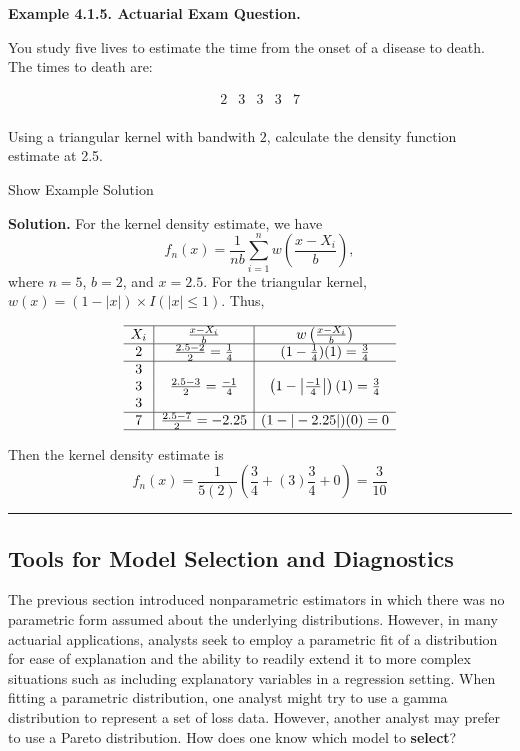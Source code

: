\documentclass[]{book}
\theoremstyle{definition}
\theoremstyle{definition}
\theoremstyle{definition}
\theoremstyle{remark}
\begin{document}
\textbf{Example 4.1.5. Actuarial Exam Question.}

You study five lives to estimate the time from the onset of a disease to
death. The times to death are:

\[
\begin{array}{ccccc}
2 & 3 & 3 & 3 & 7  \\
\end{array}
\]

Using a triangular kernel with bandwith \(2\), calculate the density
function estimate at 2.5.

Show Example Solution

\hypertarget{toggleExampleSelect.1.5}{}
\textbf{Solution.} For the kernel density estimate, we have
\[f_n(x) = \frac{1}{nb} \sum_{i=1}^n w\left(\frac{x-X_i}{b}\right),\]
where \(n=5\), \(b=2\), and \(x=2.5\). For the triangular kernel,
\(w(x) = (1-|x|)\times I(|x| \le 1)\). Thus,

\[
\begin{array}{c|c|c}
\hline
X_i & \frac{x-X_i}{b} & w\left(\frac{x-X_i}{b} \right) \\
\hline
2 & \frac{2.5-2}{2}=\frac{1}{4} &  (1-\frac{1}{4})(1) = \frac{3}{4} \\
\hline
3 & & \\
3 & \frac{2.5-3}{2}=\frac{-1}{4} & \left(1-\left| \frac{-1}{4} \right| \right)(1) = \frac{3}{4} \\
3 & & \\
\hline
7 & \frac{2.5-7}{2}=-2.25 & (1-|-2.25|)(0) = 0\\
\hline
\end{array}
\]

Then the kernel density estimate is
\[f_n(x) = \frac{1}{5(2)}\left( \frac{3}{4} + (3) \frac{3}{4} + 0 \right) = \frac{3}{10}\]

\begin{center}\rule{0.5\linewidth}{\linethickness}\end{center}

\subsection{Tools for Model Selection and
Diagnostics}\label{S:MS:ToolsModelSelection}

The previous section introduced nonparametric estimators in which there
was no parametric form assumed about the underlying distributions.
However, in many actuarial applications, analysts seek to employ a
parametric fit of a distribution for ease of explanation and the ability
to readily extend it to more complex situations such as including
explanatory variables in a regression setting. When fitting a parametric
distribution, one analyst might try to use a gamma distribution to
represent a set of loss data. However, another analyst may prefer to use
a Pareto distribution. How does one know which model to \textbf{select}?
\end{document}
